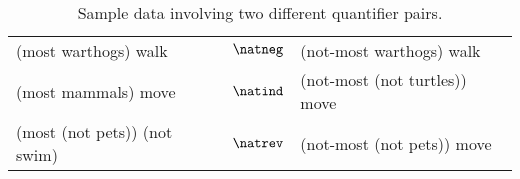 

\begin{table}[htp]
  \centering
  \begin{tabular}{l c l}
    \toprule
    (most warthogs) walk         & $\natneg$ & (not-most warthogs) walk\\
    (most mammals) move          & $\natind$ &  (not-most (not turtles)) move\\
    (most (not pets)) (not swim) & $\natrev$ & (not-most (not pets)) move\\ 
    \bottomrule
  \end{tabular}
  \caption{Sample data involving two different quantifier pairs.}
  \label{examplesofdata}
\end{table}


